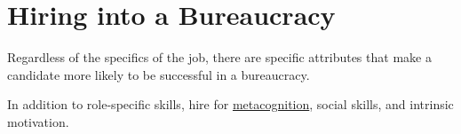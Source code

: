 \section{Hiring into a Bureaucracy}
Regardless of the specifics of the job, there are specific attributes that make a candidate more likely to be successful in a bureaucracy. 

In addition to role-specific skills, hire for \href{https://en.wikipedia.org/wiki/Metacognition}{metacognition}, social skills, and intrinsic motivation.

